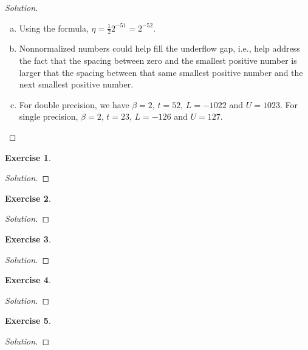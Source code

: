 \documentclass[12pt,a4]{article}
\theoremstyle{definition}
\newtheorem{exercise}{Exercise}
\begin{document}
\begin{proof}[Solution]
\begin{enumerate}[(a)]
		\item Using the formula, $\eta = \frac{1}{2} 2^{-51} = 2^{- 52}$. 
		
		\item Nonnormalized numbers could help fill the underflow gap, i.e., help address the fact that the spacing between zero and the smallest positive number is larger that the spacing between that same smallest positive number and the next smallest positive number.
		
		\item For double precision, we have $\beta = 2$, $t = 52$, $L = -1022$ and $U = 1023$. For single precision, $\beta = 2$, $t = 23$, $L = -126$ and $U = 127$. 
		
	\end{enumerate}
\end{proof}

\begin{exercise}
	 
\end{exercise}
\begin{proof}[Solution]
	
\end{proof}

\begin{exercise}
	
\end{exercise}
\begin{proof}[Solution]
	
\end{proof}

\begin{exercise}
	
\end{exercise}
\begin{proof}[Solution]
	
\end{proof}

\begin{exercise}
	
\end{exercise}
\begin{proof}[Solution]
	
\end{proof}

\begin{exercise}
	
\end{exercise}
\begin{proof}[Solution]
	
\end{proof}
\end{document}
